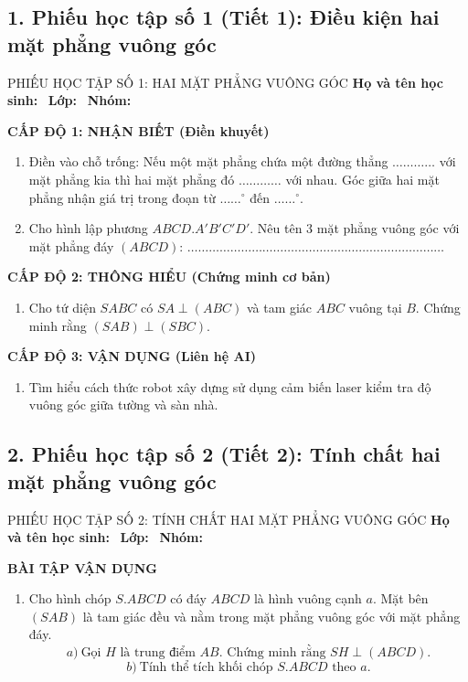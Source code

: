 \documentclass[12pt, a4paper]{article}
\begin{document}
\subsection*{1. Phiếu học tập số 1 (Tiết 1): Điều kiện hai mặt phẳng vuông góc}

\begin{pedabox}{PHIẾU HỌC TẬP SỐ 1: HAI MẶT PHẲNG VUÔNG GÓC}
\textbf{Họ và tên học sinh:} \dotfill \ \textbf{Lớp:} \dotfill \ \textbf{Nhóm:} \dotfill

\noindent \textbf{CẤP ĐỘ 1: NHẬN BIẾT (Điền khuyết)}
\begin{enumerate}[leftmargin=0.6cm]
    \item Điền vào chỗ trống:
    Nếu một mặt phẳng chứa một đường thẳng $\dots\dots\dots\dots$ với mặt phẳng kia thì hai mặt phẳng đó $\dots\dots\dots\dots$ với nhau.
    Góc giữa hai mặt phẳng nhận giá trị trong đoạn từ $\dots\dots^\circ$ đến $\dots\dots^\circ$.
    \item Cho hình lập phương $ABCD.A'B'C'D'$. Nêu tên 3 mặt phẳng vuông góc với mặt phẳng đáy $(ABCD)$:
    $\dots\dots\dots\dots\dots\dots\dots\dots\dots\dots\dots\dots\dots\dots\dots\dots\dots\dots\dots\dots\dots\dots\dots\dots$
\end{enumerate}

\noindent \textbf{CẤP ĐỘ 2: THÔNG HIỂU (Chứng minh cơ bản)}
\begin{enumerate}[leftmargin=0.6cm]
    \item Cho tứ diện $SABC$ có $SA \perp (ABC)$ và tam giác $ABC$ vuông tại $B$.
    Chứng minh rằng $(SAB) \perp (SBC)$.
\end{enumerate}

\noindent \textbf{CẤP ĐỘ 3: VẬN DỤNG (Liên hệ AI)}
\begin{enumerate}[leftmargin=0.6cm]
    \item Tìm hiểu cách thức robot xây dựng sử dụng cảm biến laser kiểm tra độ vuông góc giữa tường và sàn nhà.
\end{enumerate}
\end{pedabox}

\subsection*{2. Phiếu học tập số 2 (Tiết 2): Tính chất hai mặt phẳng vuông góc}

\begin{pedabox}{PHIẾU HỌC TẬP SỐ 2: TÍNH CHẤT HAI MẶT PHẲNG VUÔNG GÓC}
\textbf{Họ và tên học sinh:} \dotfill \ \textbf{Lớp:} \dotfill \ \textbf{Nhóm:} \dotfill

\noindent \textbf{BÀI TẬP VẬN DỤNG}
\begin{enumerate}[leftmargin=0.6cm]
    \item Cho hình chóp $S.ABCD$ có đáy $ABCD$ là hình vuông cạnh $a$. Mặt bên $(SAB)$ là tam giác đều và nằm trong mặt phẳng vuông góc với mặt phẳng đáy.
    $$a) \ \text{Gọi } H \text{ là trung điểm } AB. \text{ Chứng minh rằng } SH \perp (ABCD).$$
    $$b) \ \text{Tính thể tích khối chóp } S.ABCD \text{ theo } a.$$
\end{enumerate}
\end{pedabox}
\end{document}
